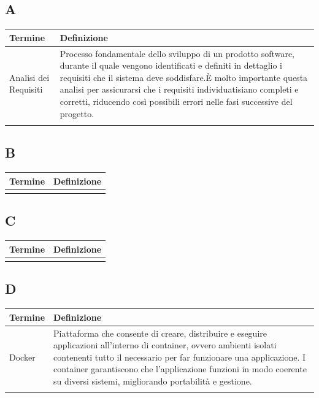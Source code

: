 \documentclass[10pt]{article}
\begin{document}
\vspace{2mm}
\renewcommand{\arraystretch}{1.5} %
\setlength{\tabcolsep}{10pt} %

\subsection{A} %
\begin{tabularx}{\textwidth}{|>{\centering\arraybackslash}l|X|}
\hline
\rowcolor[gray]{0.8}
\textbf{Termine} & \textbf{Definizione}\\
\hline
Analisi dei Requisiti & Processo fondamentale dello sviluppo di un prodotto software, durante il quale vengono identificati e definiti in dettaglio i requisiti che il sistema deve soddisfare.\newline È molto importante questa analisi per assicurarsi che i requisiti individuatisiano completi e corretti, riducendo così possibili errori nelle fasi successive del progetto.\\
\hline
 & \\
\hline
\end{tabularx}

\subsection{B} %
\begin{tabularx}{\textwidth}{|>{\centering\arraybackslash}l|X|}
\hline
\rowcolor[gray]{0.8}
\textbf{Termine} & \textbf{Definizione}\\
\hline
 & \\
\hline
\end{tabularx}

\subsection{C} %
\begin{tabularx}{\textwidth}{|>{\centering\arraybackslash}l|X|}
\hline
\rowcolor[gray]{0.8}
\textbf{Termine} & \textbf{Definizione}\\
\hline
 & \\
\hline
\end{tabularx}

\subsection{D} %
\begin{tabularx}{\textwidth}{|>{\centering\arraybackslash}l|X|}
\hline
\rowcolor[gray]{0.8}
\textbf{Termine} & \textbf{Definizione}\\
\hline
Docker & Piattaforma che consente di creare, distribuire e eseguire applicazioni all'interno di container, ovvero ambienti isolati contenenti tutto il necessario per far funzionare una applicazione. I container garantiscono che l'applicazione funzioni in modo coerente su diversi sistemi, migliorando portabilità e gestione.\\
\hline
 & \\
\hline
\end{tabularx}
\end{document}

